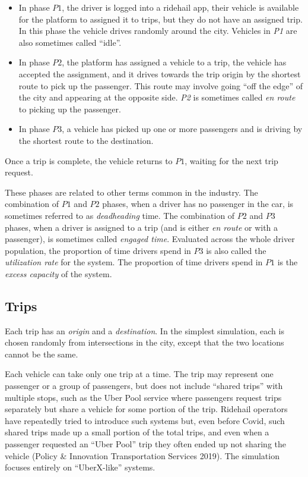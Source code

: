 \documentclass[
  letterpaper,
]{article}
\begin{document}
\begin{itemize}
\item
  In phase \(P1\), the driver is logged into a ridehail app, their
  vehicle is available for the platform to assigned it to trips, but
  they do not have an assigned trip. In this phase the vehicle drives
  randomly around the city. Vehicles in \emph{P1} are also sometimes
  called ``idle''.
\item
  In phase \(P2\), the platform has assigned a vehicle to a trip, the
  vehicle has accepted the assignment, and it drives towards the trip
  origin by the shortest route to pick up the passenger. This route may
  involve going ``off the edge'' of the city and appearing at the
  opposite side. \emph{P2} is sometimes called \emph{en route} to
  picking up the passenger.
\item
  In phase \(P3\), a vehicle has picked up one or more passengers and is
  driving by the shortest route to the destination.
\end{itemize}

Once a trip is complete, the vehicle returns to \(P1\), waiting for the
next trip request.

These phases are related to other terms common in the industry. The
combination of \(P1\) and \(P2\) phases, when a driver has no passenger
in the car, is sometimes referred to as \emph{deadheading} time. The
combination of \(P2\) and \(P3\) phases, when a driver is assigned to a
trip (and is either \emph{en route} or with a passenger), is sometimes
called \emph{engaged time}. Evaluated across the whole driver
population, the proportion of time drivers spend in \(P3\) is also
called the \emph{utilization rate} for the system. The proportion of
time drivers spend in \(P1\) is the \emph{excess capacity} of the
system.

\hypertarget{trips}{%
\subsection{Trips}\label{trips}}

Each trip has an \emph{origin} and a \emph{destination}. In the simplest
simulation, each is chosen randomly from intersections in the city,
except that the two locations cannot be the same.

Each vehicle can take only one trip at a time. The trip may represent
one passenger or a group of passengers, but does not include ``shared
trips'' with multiple stops, such as the Uber Pool service where
passengers request trips separately but share a vehicle for some portion
of the trip. Ridehail operators have repeatedly tried to introduce such
systems but, even before Covid, such shared trips made up a small
portion of the total trips, and even when a passenger requested an
``Uber Pool'' trip they often ended up not sharing the vehicle (Policy
\& Innovation Transportation Services 2019). The simulation focuses
entirely on ``UberX-like'' systems.
\end{document}
